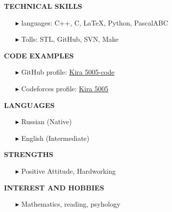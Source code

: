 \documentclass[a4paper,10pt]{article}
\begin{document}
	 \colorbox{magicmint}{
		\begin{minipage}{0.96\textwidth}
			\textbf{TECHNICAL SKILLS}
		\end{minipage}
	}
	\begin{itemize}
		\item [$\blacktriangleright$]  languages: C++, C, \LaTeX, Python, PascalABC
		\item [$\blacktriangleright$]  Tolls: STL, GitHub, SVN, Make
	\end{itemize}
	
	\colorbox{magicmint}{
		\begin{minipage}{0.96\textwidth}
			\textbf{CODE EXAMPLES}
		\end{minipage}
	}
	\begin{itemize}
		\item [$\blacktriangleright$]  GitHub profile: \href{https://github.com/Kira5005-code} {Kira\underline{ }5005-code}
		\item [$\blacktriangleright$]  Codeforces profile: \href{https://codeforces.com/profile/Kira_5005} {Kira\underline{ }5005}
	\end{itemize}
    	

    \colorbox{magicmint}{
   	\begin{minipage}{0.96\textwidth}
   		\textbf{LANGUAGES}
   	\end{minipage}
   }
    \begin{itemize}
    		\item[$\blacktriangleright$]  Russian (Native)
    		\item[$\blacktriangleright$]  English (Intermediate)
    \end{itemize}

  	 \colorbox{magicmint}{
  		\begin{minipage}{0.96\textwidth}
  			\textbf{STRENGTHS}
  		\end{minipage}
  	}
	\begin{itemize}
		\item[$\blacktriangleright$]  Positive Attitude, Hardworking
	\end{itemize}
	
	 \colorbox{magicmint}{
		\begin{minipage}{0.96\textwidth}
			\textbf{INTEREST AND HOBBIES}
		\end{minipage}
	}
	\begin{itemize}
		\item[$\blacktriangleright$]  Mathematics, reading, psyhology
	\end{itemize}
	
\end{document}
